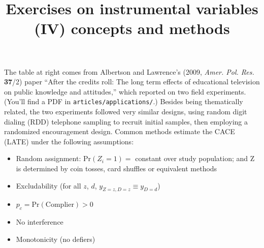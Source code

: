 \documentclass{article}
\title{Exercises on instrumental variables (IV) concepts and methods }
\begin{document}
\maketitle

\begin{minipage}{1.0\linewidth}

\begin{figure}
\end{figure}

The table at right comes from Albertson and Lawrence's (2009, \textit{Amer. Pol. Res.} \textbf{37}/2) paper ``After the credits roll: The long term effects of educational television on public knowledge and attitudes,'' which reported on two field experiments. (You'll find a PDF in \texttt{articles/applications/}.)   Besides being thematically related, the two experiments followed very similar designs, using random digit dialing (RDD) telephone sampling to recruit initial samples, then employing a randomized encouragement design.  Common methods estimate the CACE (LATE) under the following assumptions:

\begin{itemize}
\item Random assignment: $\mathrm{Pr}(Z_{i}=1) = $ constant over study population;  and $\mathrm{Z} $ is determined by coin tosses, card shuffles or equivalent methods
\item Excludability (for all $z$, $d$, $y_{Z=z, D=z} \equiv y_{D=d}$)
\item $p_{c} = \mathrm{Pr}(\mathrm{Complier}) > 0$ 
\item No interference 
\item Monotonicity (no defiers) 
\end{itemize}
  
\end{minipage}
\vspace{4ex}
\end{document}
